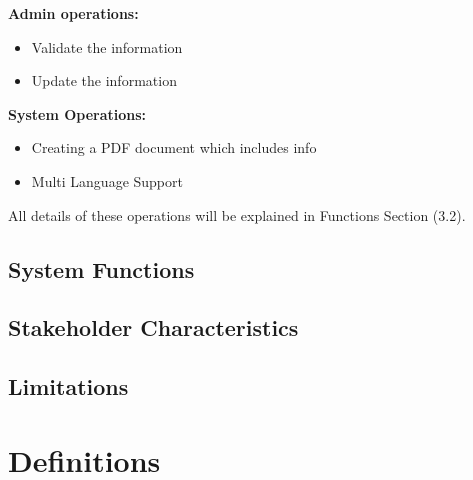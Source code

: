 \textbf{Admin operations: }
\begin{itemize}
    \item Validate the information
    \item Update the information
\end{itemize}

\textbf{System Operations: }
\begin{itemize}
    \item Creating a PDF document which includes info
    \item Multi Language Support
\end{itemize}

All details of these operations will be explained in Functions Section (3.2).

\subsection{System Functions}

\subsection{Stakeholder Characteristics}

\subsection{Limitations}

\section{Definitions}